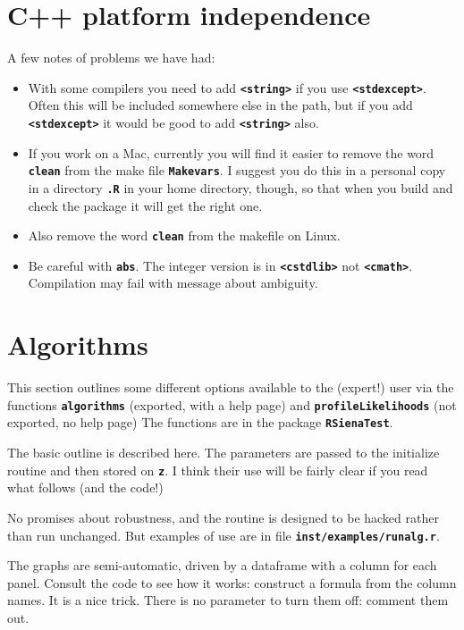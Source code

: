 \documentclass[12pt, a4paper]{article}
\renewcommand{\=}{\,=\,}
\newcommand{\+}{\,+\,}
\newcommand{\sfn}[1]{\textbf{\texttt{#1}}}
\begin{document}
\section{C++ platform independence}
A few notes of problems we have had:
\begin{itemize}
\item With some compilers you need to add \sfn{<string>} if you use
  \sfn{<stdexcept>}. Often this will be included somewhere else in the path, but
  if you add \sfn{<stdexcept>} it would be good to add \sfn{<string>} also.
  \item If you work on a Mac, currently you will find it easier to remove the
    word \sfn{clean} from the make file \sfn{Makevars}. I suggest you do this in
    a personal copy in a directory \sfn{.R} in your home directory, though, so
    that when you build and check the package it will get the right one.
\item Also remove the word \sfn{clean} from the makefile on Linux.
  \item Be careful with \sfn{abs}. The integer version is in \sfn{<cstdlib>} not
    \sfn{<cmath>}. Compilation may fail with message about ambiguity.
\end{itemize}
\section{Algorithms}
This section outlines some different options available to the (expert!) user via
the functions \sfn{algorithms} (exported, with a help page) and
\sfn{profileLikelihoods} (not exported, no help page) The functions are in the
  package \sfn{RSienaTest}.

  The basic outline is described here. The parameters are passed to the
  initialize routine and then stored on \sfn{z}. I think their use will be
  fairly clear if you read what follows (and the code!)

No promises about robustness, and the routine is designed to be hacked rather
than run unchanged. But examples of use are in file \sfn{inst/examples/runalg.r}.

The graphs are semi-automatic, driven by a dataframe with a column for each
panel. Consult the code to see how it works: construct a formula from the column
names. It is a nice trick. There is no parameter to turn them off: comment them
out.

\sfn{}
\end{document}
